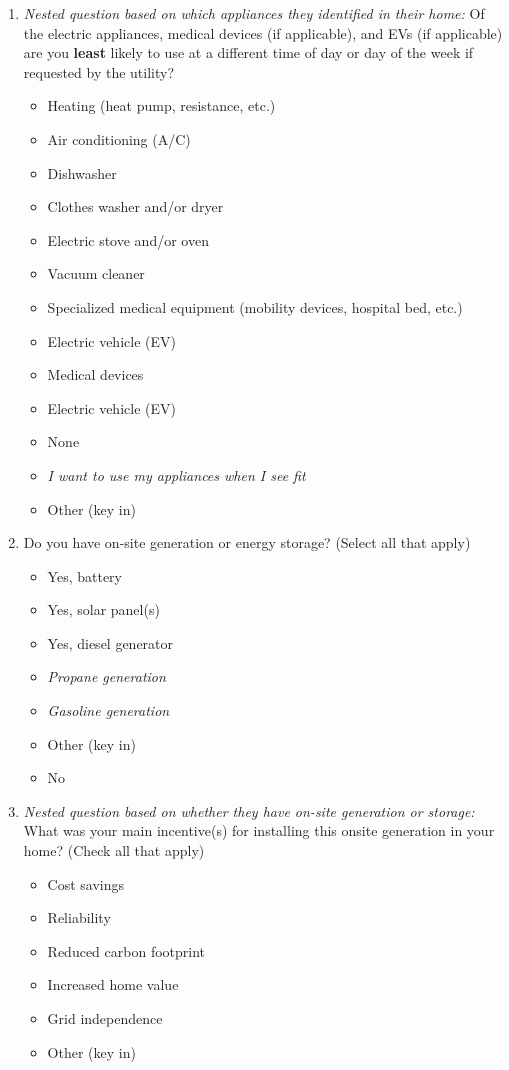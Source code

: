 \documentclass{article}
\begin{document}
\begin{enumerate}
\item \textit{Nested question based on which appliances they identified in their home:}
Of the electric appliances, medical devices (if applicable), and EVs (if applicable) are you \textbf{least} likely to use at a different time of day or day of the week if requested by the utility?
\begin{itemize}
  \item[\checkbox] Heating (heat pump, resistance, etc.)
  \item[\checkbox] Air conditioning (A/C)
  \item[\checkbox] Dishwasher
  \item[\checkbox] Clothes washer and/or dryer
  \item[\checkbox] Electric stove and/or oven
  \item[\checkbox] Vacuum cleaner
  \item[\checkbox] Specialized medical equipment (mobility devices, hospital bed, etc.)
  \item[\checkbox] Electric vehicle (EV)
  \item[\checkbox] Medical devices
  \item[\checkbox] Electric vehicle (EV)
  \item[\checkbox] None
  \item[\checkbox] \textit{I want to use my appliances when I see fit}
  \item[\checkbox] Other (key in)
\end{itemize}
 

\item Do you have on-site generation or energy storage? (Select all that apply)
\begin{itemize}
  \item[\checkbox] Yes, battery
  \item[\checkbox] Yes, solar panel(s)
  \item[\checkbox] Yes, diesel generator
  \item[\checkbox] \textit{Propane generation}
  \item[\checkbox] \textit{Gasoline generation}
  \item[\checkbox] Other (key in)
  \item[\checkbox] No
\end{itemize}
 

\item \textit{Nested question based on whether they have on-site generation or storage:}
What was your main incentive(s) for installing this onsite generation in your home? (Check all that apply)
\begin{itemize}
  \item[\checkbox] Cost savings
  \item[\checkbox] Reliability
  \item[\checkbox] Reduced carbon footprint
  \item[\checkbox] Increased home value
  \item[\checkbox] Grid independence
  \item[\checkbox] Other (key in)
\end{itemize}
 


\end{enumerate}
\end{document}
